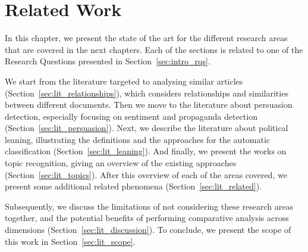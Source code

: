 \chapter{\statusgreen Related Work}
\label{chap:literature}


In this chapter, we present the state of the art for the different research areas that are covered in the next chapters. Each of the sections is related to one of the Research Questions presented in Section~\ref{sec:intro_rqs}.

We start from the literature targeted to analysing similar articles (Section~\ref{sec:lit_relationships}), which considers relationships and similarities between different documents.
Then we move to the literature about persuasion detection, especially focusing on sentiment and propaganda detection (Section~\ref{sec:lit_persuasion}).
Next, we describe the literature about political leaning, illustrating the definitions and the approaches for the automatic classification (Section~\ref{sec:lit_leaning}).
And finally, we present the works on topic recognition, giving an overview of the existing approaches (Section~\ref{sec:lit_topics}).
After this overview of each of the areas covered, we present some additional related phenomena (Section~\ref{sec:lit_related}).

Subsequently, we discuss the limitations of not considering these research areas together, and the potential benefits of performing comparative analysis across dimensions (Section~\ref{sec:lit_discussion}).
To conclude, we present the scope of this work in Section~\ref{sec:lit_scope}.


